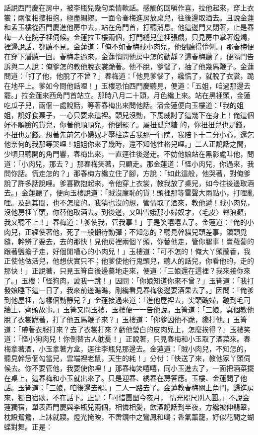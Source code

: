 \begin{showcontents}{}
話說西門慶在房中，被李瓶兒幾句柔情軟話。感觸的回嗔作喜，拉他起來，穿上衣裳；兩個相摟相抱，極盡綢繆。一面令春梅進房放桌兒，往後邊取酒去。且說金蓮和孟玉樓從西門慶進他房中去，站在角門首，打聽消息。他這邊門又閉著，止是春梅一人在院子裡伺候。金蓮拉玉樓兩個，打門縫兒望裡張覷，只見房中掌著燈燭，裡邊說話，都聽不見。金蓮道：「俺不如春梅賊小肉兒，他倒聽得伶俐。」那春梅便在穿下潛聽一回。春梅走過來，金蓮悄問他房中怎的動靜？這春梅聽了，便隔門告訴與二人說：俺爹怎的教他脫衣裳跪著。他不脫，爹惱了，抽了他幾馬鞭子。金蓮問道：「打了他，他脫了不曾？」春梅道：「他見爹惱了，纔慌了，就脫了衣裳，跪在地平上。爹如今問他話哩！」玉樓恐怕西門慶聽見，便道：「五姐，咱過那邊去罷。」拉金蓮來西角門首站立。那時八月二十頭，月色纔上來。站在黑裡頭，金蓮吃瓜子兒，兩個一處說話，等著春梅出來問他話。潘金蓮便向玉樓道：「我的姐姐，說好食菓子，一心只要來這裡。頭兒沒動，下馬威討了這幾下在身上！俺這個好不順臉的貨兒，你著他順順兒，他倒罷了。屬扭孤兒糖 的，你扭扭兒也是錢，不扭也是錢。想著先前乞小婦奴才壓柱造舌我那一行院，我陪下十二分小心，還乞他奈何的我那等哭哩！姐姐你來了幾時，還不知他性格兒哩。」二人正說話之間，少頃只聽開的角門響，春梅出來，一直逕往後邊走。不妨他娘站在黑影處叫他，問道：「小肉兒，那去？」那春梅笑著，只顧走。那金蓮道：「怪小肉兒，你過來，我問你話。慌走怎的？」那春梅方纔立住了腳，方說：「如此這般，他哭著，對俺爹說了許多話說哩。爹喜歡抱起來，令他穿上衣裳，教我放了桌兒，如今往後邊取酒去。」金蓮聽了，便向玉樓說道：「賊沒廉恥的貨！頭裡那等雷聲大雨點小，打哩亂哩。及到其間，也不怎麼的。我猜也沒的想，管情取了酒來，教他遞！賊小肉兒，沒他房裡丫頭，你替他取酒去。到後邊，又叫雪娥那小婦奴才，〈毛皮〉聲浪顙，我又聽不上！」春梅道：「爹使我，管我事！」于是笑嘻嘻去了。金蓮道：「俺的小肉兒，正經使著他，死了一般懶待動彈；不知怎的？聽見幹貓兒頭差事，鑽頭覓縫，幹辨了要去，去的那快！見他房裡兩個丫頭，你替他走，管你腿事！賣蘿蔔的跟著鹽擔子走，好個閒嘈心的小肉兒！」玉樓道：「可不怎的！俺大丫頭蘭香，我正使他做活兒，他想伏實只不；他爹使他行鬼頭兒，聽人的話兒，你看他的，走的那快！」正說著，只見玉筲自後邊驀地走來，便道：「三娘還在這裡？我來接你來了。」玉樓：「怪狗肉，諕我一跳！」因問：「你娘知道你來不曾？」玉筲道：「我打發娘睡下這一日了，我來前邊瞧瞧，剛纔看見春梅後邊要酒果去了。」因問：「俺爹到他屋裡，怎樣個動靜兒？」金蓮接過來道：「進他屋裡去，尖頭醜婦，蹦到毛司牆上，齊頭故事。」玉筲又問玉樓，玉樓便一一告他說。玉筲道：「三娘，真個教他脫了衣裳跪著，打了他五馬鞭子來？」玉樓道：「你爹因他不跪，纔打他。」玉筲道：「帶著衣服打來？去了衣裳打來？虧他瑩白的皮肉兒上，怎麼挨得？」玉樓笑道：「怪小狗肉兒！你倒替古人躭憂！」正說著，只見春梅和小玉取了酒菜來。春梅拿著酒，小玉拿著方盒，逕往李瓶兒那邊去。金蓮道：「賊小肉兒，不知怎的，聽見幹恁個勾當兒，雲端裡老鼠，天生的耗！」分付：「快送了來，教他家丫頭伺候去。你不要管他，我要使你哩！」那春梅笑嘻嘻，同小玉進去了，一面把酒菜擺在桌上，這春梅和小玉就出來了。只是迎春、綉春在房答應。玉樓、金蓮問了他話。玉筲道：「三娘，咱後邊去罷。」二人一路去了。金蓮教春梅關上角門，歸進房來，獨自宿歇，不在話下。正是：「可惜團圞今夜月，  情光咫尺別人圓。」不說金蓮獨宿，單表西門慶與李瓶兒兩個，相憐相愛，飲酒說話到半夜，方纔被伸翡翠，枕設鴛鴦，上牀就寢。燈光掩映，不啻鏡中之鸞鳳和鳴；香氣薰籠，好似花間之蝴蝶對舞。正是：


\end{showcontents}
